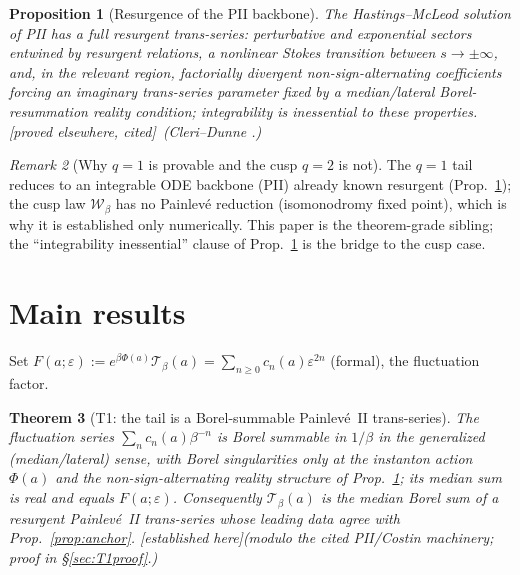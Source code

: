 \documentclass[11pt,reqno]{amsart}
\theoremstyle{plain}
\newtheorem{theorem}{Theorem}
\newtheorem{proposition}[theorem]{Proposition}
\theoremstyle{definition}
\theoremstyle{remark}
\newtheorem{remark}[theorem]{Remark}
\newcommand{\eps}{\varepsilon}
\newcommand{\tagPr}{{\footnotesize\textsf{[established here]}}}
\newcommand{\tagP}{{\footnotesize\textsf{[proved elsewhere, cited]}}}
\begin{document}
\begin{proposition}[Resurgence of the PII backbone]\label{prop:hm}
The Hastings--McLeod solution of PII has a full resurgent trans-series: perturbative and
exponential sectors entwined by resurgent relations, a nonlinear Stokes transition between
$s\to\pm\infty$, and, in the relevant region, factorially divergent \emph{non-sign-alternating}
coefficients forcing an imaginary trans-series parameter fixed by a median/lateral
Borel-resummation reality condition; integrability is inessential to these properties. \tagP\
\emph{(Cleri--Dunne \cite{CleriDunne}.)}
\end{proposition}

\begin{remark}[Why $q{=}1$ is provable and the cusp $q{=}2$ is not]\label{rem:crutch}
The $q{=}1$ tail reduces to an integrable ODE backbone (PII) already known resurgent
(Prop.~\ref{prop:hm}); the cusp law $\mathcal W_\beta$ has no Painlev\'e reduction (isomonodromy
fixed point), which is why it is established only numerically. This paper is the theorem-grade
sibling; the ``integrability inessential'' clause of Prop.~\ref{prop:hm} is the bridge to the cusp
case.
\end{remark}

\section{Main results}\label{sec:results}

Set $F(a;\eps):=e^{\beta\Phi(a)}\mathcal T_\beta(a)=\sum_{n\ge0}c_n(a)\eps^{2n}$ (formal), the
fluctuation factor.

\begin{theorem}[T1: the tail is a Borel-summable Painlev\'e~II trans-series]\label{thm:T1}
The fluctuation series $\sum_n c_n(a)\beta^{-n}$ is Borel summable in $1/\beta$ in the generalized
(median/lateral) sense, with Borel singularities only at the instanton action $\Phi(a)$ and the
non-sign-alternating reality structure of Prop.~\ref{prop:hm}; its median sum is real and equals
$F(a;\eps)$. Consequently $\mathcal T_\beta(a)$ is the median Borel sum of a resurgent
Painlev\'e~II trans-series whose leading data agree with Prop.~\ref{prop:anchor}. \tagPr\emph{(modulo
the cited PII/Costin machinery; proof in \S\ref{sec:T1proof}.)}
\end{theorem}
\end{document}
